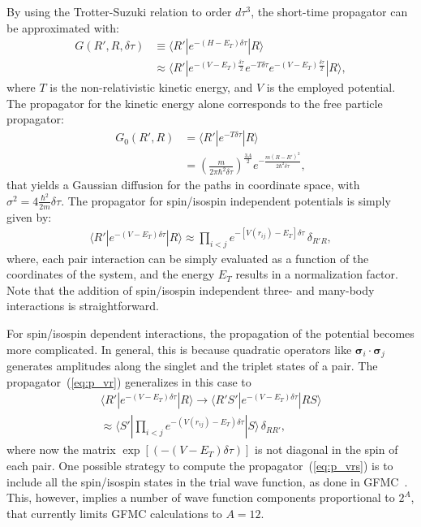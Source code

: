 \documentclass[aps,prc,twocolumn,superscriptaddress,showpacs,floatfix,nofootinbib]{revtex4-1}
\begin{document}
By using the Trotter-Suzuki relation to order $d\tau^3$,
the short-time propagator can be approximated with:
\begin{align}
G(R',R,\delta\tau)&\equiv\langle R'|e^{-(H-E_T)\delta\tau}|R\rangle \nonumber \\
&\approx \langle R'|e^{-(V-E_T)\frac{\delta\tau}{2}}e^{-T\delta\tau}e^{-(V-E_T)\frac{\delta\tau}{2}}
|R\rangle ,
\end{align}
where $T$ is the non-relativistic kinetic energy, and $V$ is the employed potential.
The propagator for the kinetic energy alone corresponds to the free particle propagator:
\begin{align} 
G_0(R',R)&=\langle R'|e^{-T\delta\tau}|R\rangle\nonumber \\
&=\left(\frac{m}{2\pi\hbar^2\delta\tau}\right)^{\frac{3A}{2}}e^{-\frac{m(R-R')^2}{2\hbar^2\delta\tau}} ,
\label{eq:g0}
\end{align}
that yields a Gaussian diffusion for the paths in coordinate space, with
$\sigma^2 = 4 \frac{\hbar^2}{2m} \delta\tau$.
The propagator for spin/isospin independent potentials is simply given by: 
\begin{align}
\langle R'|e^{-(V-E_T)\delta\tau}|R\rangle \approx
\prod_{i<j}e^{-[V(r_{ij})-E_T]\delta\tau}\,\delta_{R'R} ,
\label{eq:p_vr}
\end{align}
where, each pair interaction can be simply evaluated as a function of the coordinates of the 
system, and the energy $E_T$ results in a normalization factor. 
Note that the addition of spin/isospin independent three- and many-body interactions
is straightforward.

For spin/isospin dependent interactions, the propagation of the potential becomes more complicated.
In general, this is because quadratic operators like $\bm\sigma_i\cdot\bm\sigma_j$
generates amplitudes along the singlet and the triplet states of a pair. 
The propagator~(\ref{eq:p_vr}) generalizes in this case to
\begin{align}
\langle R'|e^{-(V-E_T)\delta\tau}|R\rangle  \rightarrow
\langle R'S'|e^{-(V-E_T)\delta\tau}|RS\rangle \nonumber \\
 \approx \langle S'|\prod_{i<j}e^{-(V(r_{ij})-E_T)\delta\tau}|S\rangle\,\delta_{RR'} ,
\label{eq:p_vrs}
\end{align}
where now the matrix $\exp[(-(V-E_T)\delta\tau)]$ is not diagonal in the spin of each pair.
One possible strategy to compute the propagator~(\ref{eq:p_vrs}) is to include all the  
spin/isospin states in the trial wave function, as done in GFMC~\cite{Carlson:2015}.  
This, however, implies a number of wave function components proportional to $2^A$, 
that currently limits GFMC calculations to $A=12$.
\end{document}
